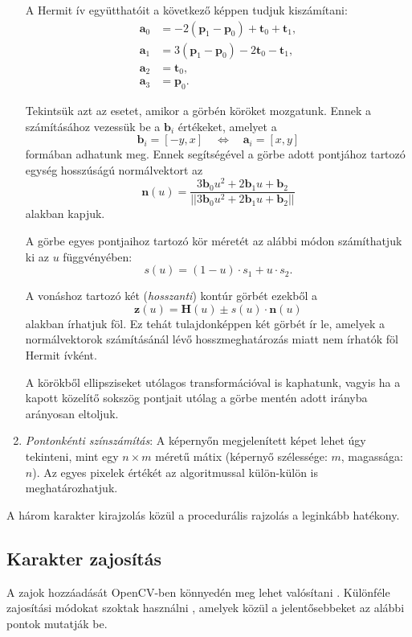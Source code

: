 \begin{enumerate}
A Hermit ív együtthatóit a következő képpen tudjuk kiszámítani:
\begin{align*}
\textbf{a}_0 &= -2(\textbf{p}_1 - \textbf{p}_0) + \textbf{t}_0 + \textbf{t}_1, \\
\textbf{a}_1 &= 3(\textbf{p}_1 - \textbf{p}_0) - 2 \textbf{t}_0 - \textbf{t}_1, \\
\textbf{a}_2 &= \textbf{t}_0, \\
\textbf{a}_3 &= \textbf{p}_0.
\end{align*}

Tekintsük azt az esetet, amikor a görbén köröket mozgatunk. Ennek a számításához vezessük be a $\textbf{b}_i$ értékeket, amelyet a
$$
\textbf{b}_i = [-y, x] \quad \Leftrightarrow \quad \textbf{a}_i = [x, y]
$$
formában adhatunk meg. Ennek segítségével a görbe adott pontjához tartozó egység hosszúságú normálvektort az
$$
\textbf{n}(u) = \dfrac{3 \textbf{b}_0 u^2 + 2 \textbf{b}_1 u + \textbf{b}_2}{
||3 \textbf{b}_0 u^2 + 2 \textbf{b}_1 u + \textbf{b}_2||
}
$$
alakban kapjuk.

A görbe egyes pontjaihoz tartozó kör méretét az alábbi módon számíthatjuk ki az $u$ függvényében:
$$
s(u) = (1 - u) \cdot s_1 + u \cdot s_2.
$$

A vonáshoz tartozó két (\textit{hosszanti}) kontúr görbét ezekből a
$$
\textbf{z}(u) = \textbf{H}(u) \pm s(u) \cdot \textbf{n}(u)
$$
alakban írhatjuk föl. Ez tehát tulajdonképpen két görbét ír le, amelyek a normálvektorok számításánál lévő hosszmeghatározás miatt nem írhatók föl Hermit ívként.

A körökből ellipsziseket utólagos transformációval is kaphatunk, vagyis ha a kapott közelítő sokszög pontjait utólag a görbe mentén adott irányba arányosan eltoljuk.

\item \textit{Pontonkénti színszámítás}: A képernyőn megjelenített képet lehet úgy tekinteni, mint egy $n \times m$ méretű mátix (képernyő szélessége: $m$, magassága: $n$). Az egyes pixelek értékét az algoritmussal külön-külön is meghatározhatjuk.

\end{enumerate}

A három karakter kirajzolás közül a procedurális rajzolás a leginkább hatékony.

\subsection{Karakter zajosítás}

A zajok hozzáadását OpenCV-ben könnyedén meg lehet valósítani \cite{OpenCVli86}. Különféle zajosítási módokat szoktak használni \cite{WANG1973303}, amelyek közül a jelentősebbeket az alábbi pontok mutatják be.

